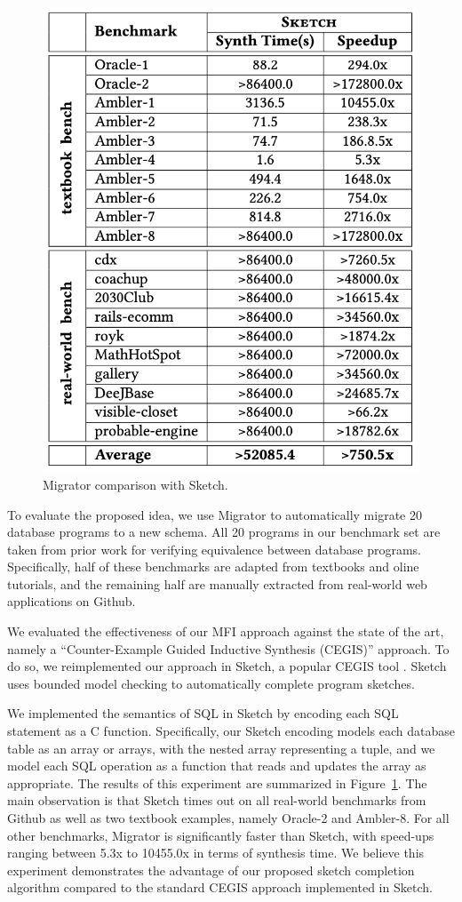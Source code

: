 \documentclass[]{article}
\begin{document}
                \begin{figure}[!t]
                    \centering
                    \includegraphics[width=.6\textwidth]{migrator_sketch_results}
                    \caption{Migrator comparison with Sketch.}
                    \label{fig:migrator_sketch_results}
                \end{figure}

                To evaluate the proposed idea, we use Migrator to automatically migrate 20 database programs to a new schema. All 20 programs in our benchmark set are taken from prior work \cite{wang2017verifying} for verifying equivalence between database programs. Specifically, half of these benchmarks are adapted from textbooks and oline tutorials, and the remaining half are manually extracted from real-world web applications on Github. 

                We evaluated the effectiveness of our MFI approach against the state of the art, namely a  ``Counter-Example Guided Inductive Synthesis (CEGIS)'' approach. To do so, we reimplemented our approach in Sketch, a popular CEGIS tool \cite{sketch}. Sketch uses bounded model checking to automatically complete program sketches. 

                We implemented the semantics of SQL in Sketch by encoding each SQL statement as a C function. Specifically, our Sketch encoding models each database table as an array or arrays, with the nested array representing a tuple, and we model each SQL operation as a function that reads and updates the array as appropriate. The results of this experiment are summarized in Figure~\ref{fig:migrator_sketch_results}. The main observation is that Sketch times out on all real-world benchmarks from Github as well as two textbook examples, namely Oracle-2 and Ambler-8. For all other benchmarks, Migrator is significantly faster than Sketch, with speed-ups ranging between 5.3x to 10455.0x in terms of synthesis time. We believe this experiment demonstrates the advantage of our proposed sketch completion algorithm compared to the standard CEGIS approach implemented in Sketch. 
\end{document}
